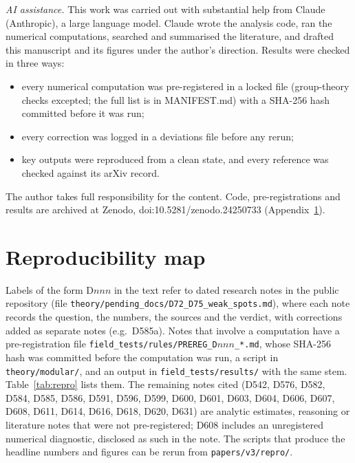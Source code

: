 \documentclass[aps,prd,twocolumn,superscriptaddress,nofootinbib,floatfix]{revtex4-2}
\begin{document}
\begin{acknowledgments}
\textit{AI assistance.} This work was carried out with substantial help from Claude (Anthropic), a large language model. Claude wrote the analysis code, ran the numerical computations, searched and summarised the literature, and drafted this manuscript and its figures under the author's direction. Results were checked in three ways:
\begin{itemize}
\item every numerical computation was pre-registered in a locked file (group-theory checks excepted; the full list is in MANIFEST.md) with a SHA-256 hash committed before it was run;
\item every correction was logged in a deviations file before any rerun;
\item key outputs were reproduced from a clean state, and every reference was checked against its arXiv record.
\end{itemize}
The author takes full responsibility for the content. Code, pre-registrations and results are archived at Zenodo, doi:10.5281/zenodo.24250733 (Appendix~\ref{app:repro}).
\end{acknowledgments}

\appendix
\section{Reproducibility map}\label{app:repro}
Labels of the form D$nnn$ in the text refer to dated research notes in the public repository (file \texttt{theory/pending\_docs/D72\_D75\_weak\_spots.md}), where each note records the question, the numbers, the sources and the verdict, with corrections added as separate notes (e.g.\ D585a). Notes that involve a computation have a pre-registration file \texttt{field\_tests/rules/PREREG\_D$nnn$\_*.md}, whose SHA-256 hash was committed before the computation was run, a script in \texttt{theory/modular/}, and an output in \texttt{field\_tests/results/} with the same stem. Table~\ref{tab:repro} lists them. The remaining notes cited (D542, D576, D582, D584, D585, D586, D591, D596, D599, D600, D601, D603, D604, D606, D607, D608, D611, D614, D616, D618, D620, D631) are analytic estimates, reasoning or literature notes that were not pre-registered; D608 includes an unregistered numerical diagnostic, disclosed as such in the note. The scripts that produce the headline numbers and figures can be rerun from \texttt{papers/v3/repro/}.
\end{document}

